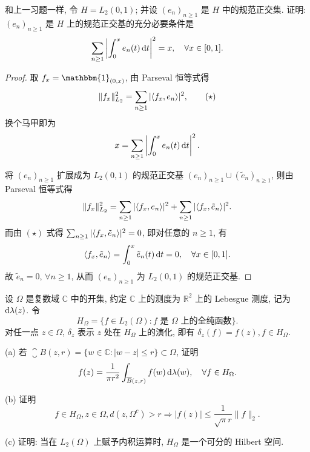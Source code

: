 \begin{exercise}
    和上一习题一样, 令 $H=L_{2}(0,1)$; 并设 $\left(e_{n}\right)_{n \geq 1}$ 是 $H$ 中的规范正交集. 
    证明: $\left(e_{n}\right)_{n \geq 1}$ 是 $H$ 上的规范正交基的充分必要条件是
    \[
    \sum_{n\geq 1}\left|\int_{0}^{x} e_{n}(t)\mathop{}\!\mathrm{d} t\right|^{2}=x, \quad \forall x \in[0,1].
    \]
\end{exercise}

\begin{proof}
    \necessary
    取 $f_x=\mathbbm{1}_{(0,x)}$, 由 Parseval 恒等式得 
    \begin{equation}
        \|f_x\|_{L_2}^2=\sum_{n\geq 1}|\langle f_x,e_n\rangle|^2,\tag{$\star$}
    \end{equation}
    换个马甲即为
    \[x=\sum_{n\geq 1}\left|\int_{0}^{x} e_{n}(t)\mathop{}\!\mathrm{d} t\right|^{2}.\]

    \sufficient
    将 $(e_n)_{n\geq 1}$ 扩展成为 $L_2(0,1)$ 的规范正交基 $(e_n)_{n\geq 1}\cup(\tilde{e}_n)_{n\geq 1}$,
    则由 Parseval 恒等式得
    \[\|f_x\|_{L_2}^2=\sum_{n\geq 1}|\langle f_x,e_n\rangle|^2+\sum_{n\geq 1}|\langle f_x,\tilde{e}_n\rangle|^2.\]
    而由 $(\star)$ 式得 $\sum_{n\geq 1}|\langle f_x,\tilde{e}_n\rangle|^2=0$, 即对任意的 $n\geq 1$, 有
    \[\langle f_x,\tilde{e}_n\rangle=\int_0^x \tilde{e}_n(t)\mathop{}\!\mathrm{d} t=0,\quad\forall x\in [0,1].\]
    故 $\tilde{e}_n=0$, $\forall n\geq 1$, 从而 $(e_n)_{n\geq 1}$ 为 $L_2(0,1)$ 的规范正交基.
\end{proof}



\begin{exercise}
    设 $\Omega$ 是复数域 $\mathbb{C}$ 中的开集, 约定 $\mathbb{C}$ 
    上的测度为 $\mathbb{R}^{2}$ 上的 Lebesgue 测度, 记为 $\mathop{}\!\mathrm{d} \lambda(z)$. 令
    \[H_{\Omega}=\{f\in L_{2}(\Omega): f \text{\ 是\ }\Omega\text{\ 上的全纯函数}\}.\]
    对任一点 $z\in\Omega$, $\delta_{z}$ 表示 $z$ 处在 $H_{\Omega}$ 上的演化, 即有 $\delta_{z}(f)=f(z), f \in H_{\Omega}$.

    (a) 若 $\closure{B}(z, r)=\{w\in\mathbb{C}:|w-z|\leq r\}\subset\Omega$, 证明
    \[
    f(z)=\frac{1}{\pi r^2} \int_{\overline{B}(z, r)} f(w)\mathop{}\!\mathrm{d}\lambda(w), \quad\forall f\in H_{\Omega}.
    \]

    (b) 证明
    \[
    f \in H_{\Omega}, z \in\Omega, d(z,\Omega^{c})>r\Longrightarrow|f(z)| \leq \frac{1}{\sqrt{\pi} r}\|f\|_{2}.
    \]
    
    (c) 证明: 当在 $L_{2}(\Omega)$ 上赋予内积运算时, $H_{\Omega}$ 是一个可分的 Hilbert 空间.
\end{exercise}



